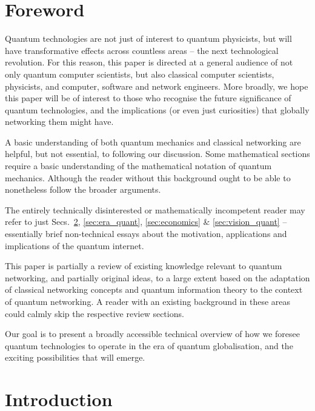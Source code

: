 \documentclass[aps,rmp,twocolumn,amsmath,amssymb,nofootinbib,superscriptaddress,longbibliography,floatfix]{revtex4-1}
\begin{document}
\tableofcontents

%
%

\section{Foreword}

Quantum technologies are not just of interest to quantum physicists, but will have transformative effects across countless areas -- the next technological revolution. For this reason, this paper is directed at a general audience of not only quantum computer scientists, but also classical computer scientists, physicists, and computer, software and network engineers. More broadly, we hope this paper will be of interest to those who recognise the future significance of quantum technologies, and the implications (or even just curiosities) that globally networking them might have.

A basic understanding of both quantum mechanics \cite{bib:Sakurai94} and classical networking \cite{???} are helpful, but not essential, to following our discussion. Some mathematical sections require a basic understanding of the mathematical notation of quantum mechanics. Although the reader without this background ought to be able to nonetheless follow the broader arguments.

The entirely technically disinterested or mathematically incompetent reader may refer to just Secs.~\ref{sec:introduction}, \ref{sec:era_quant}, \ref{sec:economics} \& \ref{sec:vision_quant} -- essentially brief non-technical essays about the motivation, applications and implications of the quantum internet.

This paper is partially a review of existing knowledge relevant to quantum networking, and partially original ideas, to a large extent based on the adaptation of classical networking concepts and quantum information theory to the context of quantum networking. A reader with an existing background in these areas could calmly skip the respective review sections.

Our goal is to present a broadly accessible technical overview of how we foresee quantum technologies to operate in the era of quantum globalisation, and the exciting possibilities that will emerge.

%
%

\section{Introduction} \label{sec:introduction}
\end{document}
